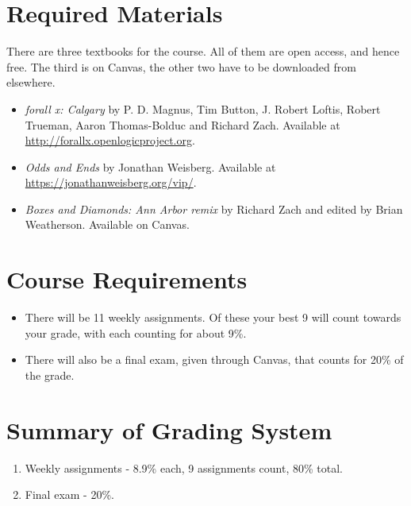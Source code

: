 \documentclass[
]{article}
\providecommand{\tightlist}{%
  \setlength{\itemsep}{0pt}\setlength{\parskip}{0pt}}
\begin{document}
\hypertarget{required-materials}{%
\section{Required Materials}\label{required-materials}}

There are three textbooks for the course. All of them are open access,
and hence free. The third is on Canvas, the other two have to be
downloaded from elsewhere.

\begin{itemize}
\tightlist
\item
  \emph{forall x: Calgary} by P. D. Magnus, Tim Button, J. Robert
  Loftis, Robert Trueman, Aaron Thomas-Bolduc and Richard Zach.
  Available at \url{http://forallx.openlogicproject.org}.
\item
  \emph{Odds and Ends} by Jonathan Weisberg. Available at
  \url{https://jonathanweisberg.org/vip/}.
\item
  \emph{Boxes and Diamonds: Ann Arbor remix} by Richard Zach and edited
  by Brian Weatherson. Available on Canvas.
\end{itemize}

\newpage

\hypertarget{course-requirements}{%
\section{Course Requirements}\label{course-requirements}}

\begin{itemize}
\tightlist
\item
  There will be 11 weekly assignments. Of these your best 9 will count
  towards your grade, with each counting for about 9\%.
\item
  There will also be a final exam, given through Canvas, that counts for
  20\% of the grade.
\end{itemize}

\hypertarget{summary-of-grading-system}{%
\section{Summary of Grading System}\label{summary-of-grading-system}}

\begin{enumerate}
\def\labelenumi{\arabic{enumi}.}
\tightlist
\item
  Weekly assignments - 8.9\% each, 9 assignments count, 80\% total.
\item
  Final exam - 20\%.
\end{enumerate}
\end{document}
